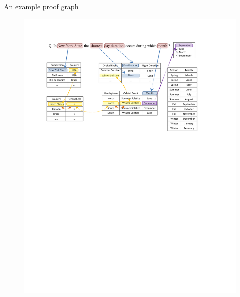 \documentclass[final]{beamer}
\newlength{\onecolwid}
\newlength{\twocolwid}
\begin{document}
\begin{frame}[t]
\begin{columns}[t]
\begin{column}{\twocolwid}
\begin{alertblock}{An example proof graph}
\begin{figure}
	\centering
\includegraphics[trim=0.0cm 16.2cm 1cm 2.3cm,clip=true, scale=2.4]{newyorkQ.pdf}	
\end{figure}

\end{alertblock} 


\begin{columns}[t,totalwidth=\twocolwid] %

\begin{column}{\onecolwid} %


\end{column} %

\end{columns} %

\end{column} %


\end{columns}
\end{frame}
\end{document}
